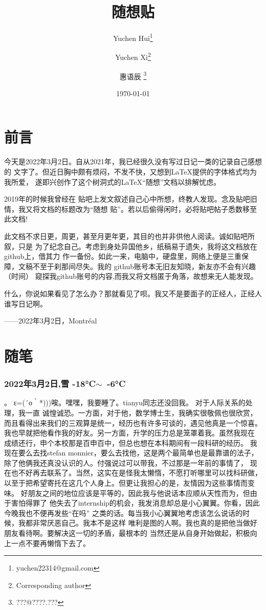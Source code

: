 \documentclass{ctexart}
\title{\textbf{\Huge{随想贴}}}
\author{Yuchen Hui\thanks{yuchen22314@gmail.com} 
\and Yuchen Xi\thanks{Corresponding author}
\and 惠语辰 \thanks{???@????.???}}
\date{\today}
\begin{document}
    \maketitle
    \tableofcontents
    \listoftables
    \listoffigures

    \newpage

    \part{前言}
    今天是2022年3月2日。自从2021年，我已经很久没有写过日记一类的记录自己感想的
    文字了。但近日胸中颇有烦闷，不发不快，又想到\LaTeX 提供的字体格式均为我所爱，
    遂即兴创作了这个树洞式的\LaTeX “随想”文档以排解忧虑。
    
    2019年的时候我曾经在
    贴吧上发文叙述自己心中所想，终教人发现。念及贴吧旧情，我又将文档的标题改为“随想
    贴”。若以后偷得闲时，必将贴吧帖子悉数移至此文档!
    
    此文档不求日更，周更，甚至月更年更，其目的也并非供他人阅读。诚如贴吧所叙，只是
    为了纪念自己。考虑到身处异国他乡，纸稿易于遗失，我将这文档放在github上，借其力
    作一备份。如此一来，电脑中，硬盘里，网络上便是三重保障，文稿不至于刹那间尽失。我的
    github账号本无旧友知晓，新友亦不会有兴趣（时间）
    窥探我github账号的内容,而我又将文档匿于角落，故想来无人能发现。
    
    什么，你说如果看见了怎么办？那就看见了呗。我又不是要面子的正经人，正经人谁写日记啊。
    \begin{flushright}
        ——2022年3月2日，Montréal
    \end{flushright}
    \part{随笔}
    \section{2022年3月2日,雪 -18°C$\sim$~-6°C}。
    ε=(´ο｀*)))唉。嘿嘿，我要睡了。tianyu同志还没回我。
    对于人际关系的处理，我一直
    诚惶诚恐。一方面，对于他，数学博士生，我确实很敬佩也很欣赏，
    而且看得出来我们的三观算是统一，经历也有许多可谈的，遇见他真是一个惊喜。
    我也早就把他看作我的好友。另一方面，升学的压力总是笼罩着我。虽然我现在
    成绩还行，申个本校那是百申百中，但总也想在本科期间有一段科研的经历。
    我现在要么去找stefan monnier，要么去找他，这是两个最简单也是最靠谱的法子，
    除了他俩我还真没认识的人。付强说过可以带我，不过那是一年前的事情了，
    现在也不好再去联系了。当然，这实在是怪我太懒惰，不愿打听哪里可以找科研做，
    以至于把希望寄托在这几个人身上。但更让我担心的是，友情因为这些事情而变味。
    好朋友之间的地位应该是平等的，因此我与他说话本应顺从天性而为，但由于害怕得罪了
    他失去了internship的机会，我发消息却总是小心翼翼。你看，因此今晚我也不便再发些“在吗”
    之类的话。每当我小心翼翼地考虑该怎么说话的时候，我都非常厌恶自己。我本不是这样
    唯利是图的人啊。我也真的是把他当做好朋友看待啊。要解决这一切的矛盾，最根本的
    当然还是从自身开始做起，积极向上一点不要再懒惰下去了。
\end{document}
